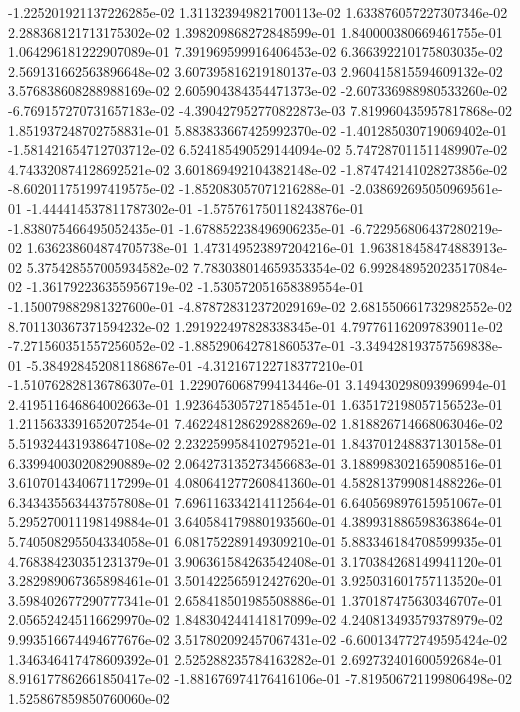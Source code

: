 -1.225201921137226285e-02
1.311323949821700113e-02
1.633876057227307346e-02
2.288368121713175302e-02
1.398209868272848599e-01
1.840000380669461755e-01
1.064296181222907089e-01
7.391969599916406453e-02
6.366392210175803035e-02
2.569131662563896648e-02
3.607395816219180137e-03
2.960415815594609132e-02
3.576838608288988169e-02
2.605904384354471373e-02
-2.607336988980533260e-02
-6.769157270731657183e-02
-4.390427952770822873e-03
7.819960435957817868e-02
1.851937248702758831e-01
5.883833667425992370e-02
-1.401285030719069402e-01
-1.581421654712703712e-02
6.524185490529144094e-02
5.747287011511489907e-02
4.743320874128692521e-02
3.601869492104382148e-02
-1.874742141028273856e-02
-8.602011751997419575e-02
-1.852083057071216288e-01
-2.038692695050969561e-01
-1.444414537811787302e-01
-1.575761750118243876e-01
-1.838075466495052435e-01
-1.678852238496906235e-01
-6.722956806437280219e-02
1.636238604874705738e-01
1.473149523897204216e-01
1.963818458474883913e-02
5.375428557005934582e-02
7.783038014659353354e-02
6.992848952023517084e-02
-1.361792236355956719e-02
-1.530572051658389554e-01
-1.150079882981327600e-01
-4.878728312372029169e-02
2.681550661732982552e-02
8.701130367371594232e-02
1.291922497828338345e-01
4.797761162097839011e-02
-7.271560351557256052e-02
-1.885290642781860537e-01
-3.349428193757569838e-01
-5.384928452081186867e-01
-4.312167122718377210e-01
-1.510762828136786307e-01
1.229076068799413446e-01
3.149430298093996994e-01
2.419511646864002663e-01
1.923645305727185451e-01
1.635172198057156523e-01
1.211563339165207254e-01
7.462248128629288269e-02
1.818826714668063046e-02
5.519324431938647108e-02
2.232259958410279521e-01
1.843701248837130158e-01
6.339940030208290889e-02
2.064273135273456683e-01
3.188998302165908516e-01
3.610701434067117299e-01
4.080641277260841360e-01
4.582813799081488226e-01
6.343435563443757808e-01
7.696116334214112564e-01
6.640569897615951067e-01
5.295270011198149884e-01
3.640584179880193560e-01
4.389931886598363864e-01
5.740508295504334058e-01
6.081752289149309210e-01
5.883346184708599935e-01
4.768384230351231379e-01
3.906361584263542408e-01
3.170384268149941120e-01
3.282989067365898461e-01
3.501422565912427620e-01
3.925031601757113520e-01
3.598402677290777341e-01
2.658418501985508886e-01
1.370187475630346707e-01
2.056524245116629970e-02
1.848304244141817099e-02
4.240813493579378979e-02
9.993516674494677676e-02
3.517802092457067431e-02
-6.600134772749595424e-02
1.346346417478609392e-01
2.525288235784163282e-01
2.692732401600592684e-01
8.916177862661850417e-02
-1.881676974176416106e-01
-7.819506721199806498e-02
1.525867859850760060e-02
